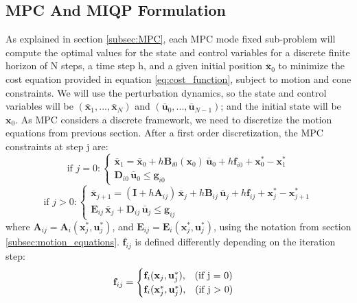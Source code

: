\documentclass[12,twoside]{TFG-GM}
\theoremstyle{definition}
\theoremstyle{remark}
\newcommand*\diff[1]{\bar{#1}}
\begin{document}
\subsection{MPC And MIQP Formulation} \label{subsec:mpc_formulation}

As explained in section \ref{subsec:MPC}, each MPC mode fixed sub-problem will compute the optimal values for the state and control variables for a discrete finite horizon of N steps, a time step h, and a given initial position $\diff{\textbf{x}}_0$ to minimize the cost equation provided in equation \ref{eq:cost_function}, subject to motion and cone constraints. We will use the perturbation dynamics, so the state and control variables will be $(\diff{\textbf{x}}_1, ..., \diff{\textbf{x}}_N)$ and $(\diff{\textbf{u}}_0, ..., \diff{\textbf{u}}_{N-1})$; and the initial state will be $\textbf{x}_0$. As MPC considers a discrete framework, we need to discretize the motion equations from previous section. After a first order discretization, the MPC constraints at step j are:
\begin{equation} \label{eq:mpc_constraints_initial_step}
\text{if } j = 0: \begin{cases}
\diff{\textbf{x}}_1 = \diff{\textbf{x}}_0 +  h \textbf{B}_{i0}(\textbf{x}_0) \, \diff{\textbf{u}}_0 + h \textbf{f}_{i0} + \textbf{x}_0^* - \textbf{x}_1^*\\
\textbf{D}_{i0} \, \diff{\textbf{u}}_0 \leq \textbf{g}_{i0}
\end{cases}
\end{equation}
\begin{equation} \label{eq:mpc_constraints_non_initial_step}
\text{if } j > 0: \begin{cases}
\diff{\textbf{x}}_{j+1} = (\textbf{I} + h \textbf{A}_{ij})\, \diff{\textbf{x}}_j + h \textbf{B}_{ij} \, \diff{\textbf{u}}_j + h \textbf{f}_{ij}  + \textbf{x}_{j}^* - \textbf{x}_{j+1}^*\\
\textbf{E}_{ij} \, \diff{\textbf{x}}_j + \textbf{D}_{ij} \, \diff{\textbf{u}}_j \leq \textbf{g}_{ij}
\end{cases}
\end{equation}
where $\textbf{A}_{ij} = \textbf{A}_i(\textbf{x}_j^*, \textbf{u}_j^*)$, and $\textbf{E}_{ij} = \textbf{E}_i(\textbf{x}_j^*, \textbf{u}_j^*)$, using the notation from section \ref{subsec:motion_equations}. $\textbf{f}_{ij}$ is defined differently depending on the iteration step:
$$ \textbf{f}_{ij} = \begin{cases} \textbf{f}_{i}(\textbf{x}_j, \textbf{u}_j^*)\text{,  \,\,\,\,(if j = 0)} \\
\textbf{f}_{i}(\textbf{x}_j^*, \textbf{u}_j^*) \text{, \,\,\,\,(if j $>$ 0)} 
\end{cases}$$
\end{document}
